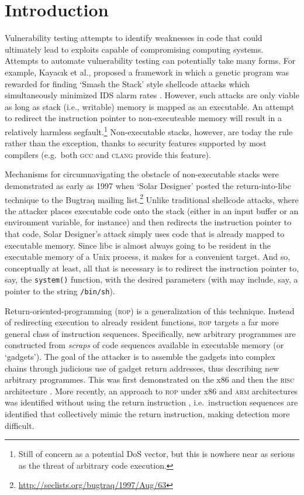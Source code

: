 %
\section{Introduction}

Vulnerability testing attempts to identify weaknesses in code
that could ultimately lead to exploits capable of compromising
computing systems. Attempts to automate vulnerability testing can
potentially take many forms. For example, Kayac\i{}k et al.,
proposed a framework in which a genetic program was rewarded for
finding `Smash the Stack' style shellcode attacks which
simultaneously minimized IDS alarm rates
\cite{kayacik06,kayacik11}. However, such attacks are only viable
as long as stack (i.e., writable) memory is mapped as an
executable. An attempt to redirect the instruction pointer to
non-executeable memory will result in a relatively harmless
segfault.\footnote{Still of concern as a potential DoS vector,
but this is nowhere near as serious as the threat of arbitrary
code execution.} Non-executable stacks, however, are today the
rule rather than the exception, thanks to security features
supported by most compilers (e.g.\ both \textsc{gcc} and \textsc{clang} provide this
feature).

Mechanisms for circumnavigating the obstacle of non-executable stacks were demonstrated as early as 1997 when `Solar Designer' posted the return-into-libc technique to the
Bugtraq mailing
list.\footnote{\url{http://seclists.org/bugtraq/1997/Aug/63}}
Unlike traditional shellcode attacks, where the attacker places
executable code onto the stack (either in an input buffer or an
environment variable, for instance) and then redirects the
instruction pointer to that code, Solar Designer's attack simply
uses code that is already mapped to executable memory. Since libc
is almost always going to be resident in the executable memory of
a Unix process, it makes for a convenient target. And so,
conceptually at least, all that is necessary is to redirect the
instruction pointer to, say, the \texttt{system()} function, with
the desired parameters (with may include, say, a pointer to the string
\texttt{/bin/sh}). 

Return-oriented-programming (\textsc{rop}) is a generalization of this
technique. Instead of redirecting execution to already resident
functions, \textsc{rop} targets a far more general class of instruction
sequences. Specifically, new arbitrary programmes are constructed
from \textit{scraps} of code sequences available in executable
memory (or `gadgets'). The goal of the attacker is to assemble
the gadgets into complex chains through judicious use of gadget
return addresses, thus describing new arbitrary programmes. This
was first demonstrated on the x86 \cite{shacham07} and then the
\textsc{risc} architecture \cite{buchanan08}. More recently, an approach
to \textsc{rop} under x86 and \textsc{arm} architectures was identified without
using the return instruction \cite{checkoway10}, i.e.\ instruction
sequences are identified that collectively mimic the return
instruction, making detection more difficult.


